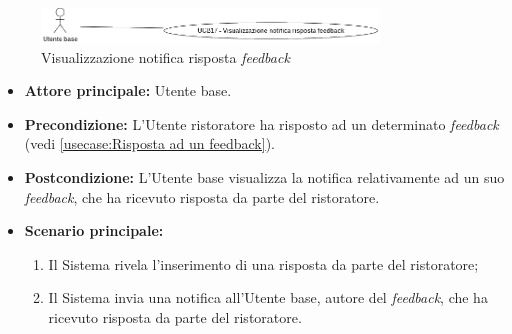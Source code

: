 \newpage
{}
\label{usecase:Visualizzazione notifica risposta feedback}

\begin{figure}[h]
	\centering
	\includegraphics[width=0.8\textwidth]{./uml/UCB17.png} 
	\caption{Visualizzazione notifica risposta \textit{feedback}}
	\label{fig:UCB19}
  \end{figure}

\begin{itemize}
	\item \textbf{Attore principale:} Utente base.

	\item \textbf{Precondizione:} L'Utente ristoratore ha risposto ad un determinato \textit{feedback} (vedi \autoref{usecase:Risposta ad un feedback}).


	\item \textbf{Postcondizione:} L'Utente base visualizza la notifica relativamente ad un suo \textit{feedback}, che ha ricevuto risposta da parte del ristoratore.

	\item \textbf{Scenario principale:}
	      \begin{enumerate}
		      \item Il Sistema rivela l'inserimento di una risposta da parte del ristoratore;

		      \item Il Sistema invia una notifica all'Utente base, autore del \textit{feedback}, che ha ricevuto risposta da parte del ristoratore.
	      \end{enumerate}
\end{itemize}
